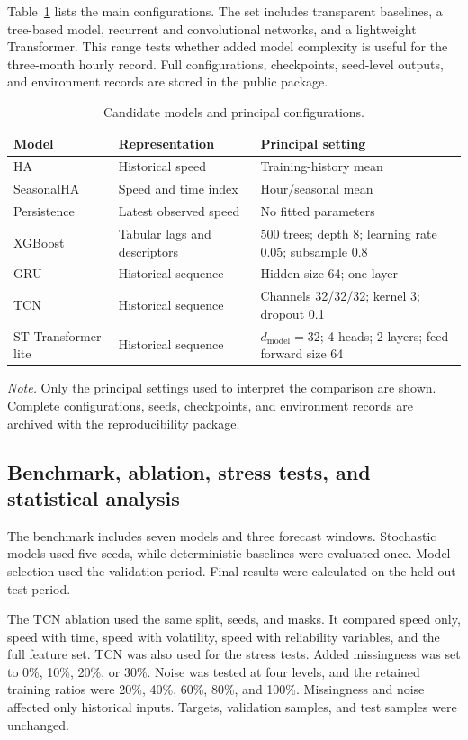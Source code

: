 \documentclass[smallcondensed]{svjour3}
\newcommand{\tabnote}[1]{\vspace{2pt}\parbox{0.94\textwidth}{\footnotesize\textit{Note.} #1}}
\begin{document}
Table~\ref{tab:models} lists the main configurations. The set includes transparent baselines, a tree-based model, recurrent and convolutional networks, and a lightweight Transformer. This range tests whether added model complexity is useful for the three-month hourly record. Full configurations, checkpoints, seed-level outputs, and environment records are stored in the public package.
\begin{table}[!htbp]
\caption{Candidate models and principal configurations.}\label{tab:models}
\centering\scriptsize
\begin{tabularx}{0.94\textwidth}{>{\raggedright\arraybackslash}p{}>{\raggedright\arraybackslash}p{}X}
\hline
\textbf{Model} & \textbf{Representation} & \textbf{Principal setting}\\
\hline
HA & Historical speed & Training-history mean\\
\hline
SeasonalHA & Speed and time index & Hour/seasonal mean\\
\hline
Persistence & Latest observed speed & No fitted parameters\\
\hline
XGBoost & Tabular lags and descriptors & 500 trees; depth 8; learning rate 0.05; subsample 0.8\\
\hline
GRU & Historical sequence & Hidden size 64; one layer\\
\hline
TCN & Historical sequence & Channels 32/32/32; kernel 3; dropout 0.1\\
\hline
ST-Transformer-lite & Historical sequence & $d_{\mathrm{model}}=32$; 4 heads; 2 layers; feed-forward size 64\\
\hline
\end{tabularx}
\tabnote{Only the principal settings used to interpret the comparison are shown. Complete configurations, seeds, checkpoints, and environment records are archived with the reproducibility package.}
\end{table}

\subsection{Benchmark, ablation, stress tests, and statistical analysis}
The benchmark includes seven models and three forecast windows. Stochastic models used five seeds, while deterministic baselines were evaluated once. Model selection used the validation period. Final results were calculated on the held-out test period.

The TCN ablation used the same split, seeds, and masks. It compared speed only, speed with time, speed with volatility, speed with reliability variables, and the full feature set. TCN was also used for the stress tests. Added missingness was set to 0\%, 10\%, 20\%, or 30\%. Noise was tested at four levels, and the retained training ratios were 20\%, 40\%, 60\%, 80\%, and 100\%. Missingness and noise affected only historical inputs. Targets, validation samples, and test samples were unchanged.
\end{document}
